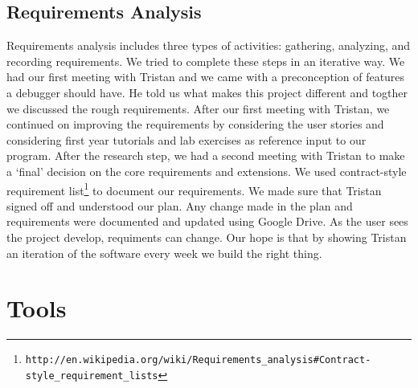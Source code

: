 \documentclass[11pt, a4paper]{article}
\begin{document}
\subsection{Requirements Analysis}
Requirements analysis includes three types of activities: gathering, analyzing, and recording requirements. We tried to complete these steps in an iterative way. We had our first meeting with Tristan 
and we came with a preconception of features a debugger should have. He told us what makes this project different and togther we discussed the rough requirements.
After our first meeting with Tristan, we continued on improving the requirements by considering the user stories and considering first year tutorials and lab exercises as reference input to our program.
After the research step, we had a second meeting with Tristan to make a `final' decision on the core requirements and extensions. We used contract-style requirement list\footnote{\tt{http://en.wikipedia.org/wiki/Requirements\_analysis\#Contract-style\_requirement\_lists}} to document our requirements. We made sure that Tristan signed off and understood our plan.
Any change made in the plan and requirements were documented and updated using Google Drive.
As the user sees the project develop, requiments can change. Our hope is that by showing Tristan an iteration of the software every week we build the right thing.

\section{Tools}
\end{document}
